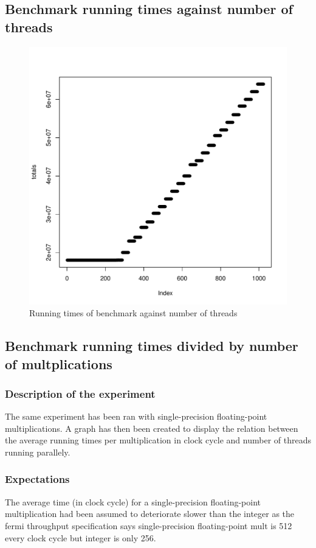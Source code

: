 \documentclass{article}
\def \scalingfactor{.8}
\begin{document}
	\subsection{Benchmark running times against number of threads}
    \begin{figure}[h]
    	\centering
		\vspace{-20pt}
	    \includegraphics[width=\scalingfactor\linewidth]{"graphics/running_times"}
		\vspace{-15pt}
        \caption{Running times of benchmark against number of threads}
    \end{figure}
	\pagebreak

	\subsection{Benchmark running times divided by number of multplications}
	\subsubsection{Description of the experiment}
	The same experiment has been ran with single-precision floating-point multiplications. A graph has then been created to display the relation between the average running times per multiplication in clock cycle and number of threads running parallely.
	\subsubsection{Expectations}
	The average time (in clock cycle) for a single-precision floating-point multiplication had been assumed to deteriorate slower than the integer as the fermi throughput specification says single-precision floating-point mult is 512 every clock cycle but integer is only 256.
\end{document}
